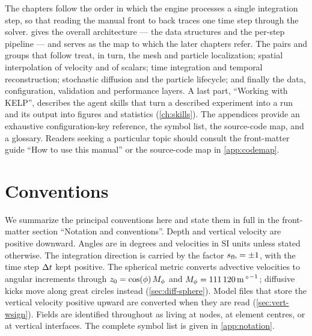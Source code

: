 The chapters follow the order in which the engine processes a single integration
step, so that reading the manual front to back traces one time step through the
solver.  gives the overall architecture --- the data structures and
the per-step pipeline --- and serves as the map to which the later chapters
refer. The pairs and groups that follow treat, in turn, the mesh and particle
localization; spatial interpolation of velocity and of scalars; time integration
and temporal reconstruction; stochastic diffusion and the particle lifecycle; and
finally the data, configuration, validation and performance layers. A last part, ``Working with
KELP'', describes the agent skills that turn a described experiment into a run and its output into
figures and statistics (\cref{ch:skills}). The appendices provide an exhaustive configuration-key reference, the symbol list,
the source-code map, and a glossary. Readers seeking a particular topic should
consult the front-matter guide ``How to use this manual'' or the source-code map
in \cref{app:codemap}.

\section{Conventions}\label{sec:intro-conv}

We summarize the principal conventions here and state them in full in the
front-matter section ``Notation and conventions''. Depth and vertical velocity are
positive downward. Angles are in degrees and velocities in SI units unless stated
otherwise. The integration direction is carried by the factor $s_{\mathrm{fb}}=\pm1$, with
the time step $\Delta t$ kept positive. The spherical metric converts advective velocities to
angular increments through $z_{0}=\cos(\phi)\,M_{\phi}$ and
$M_{\phi}=\SI{111120}{\metre\per\degree}$; diffusive kicks move along great circles instead
(\cref{sec:diff-sphere}). Model files that store the vertical velocity positive upward are converted when
they are read (\cref{sec:vert-wsign}). Fields are identified throughout as living
at nodes, at element centres, or at vertical interfaces. The complete symbol list
is given in \cref{app:notation}.
